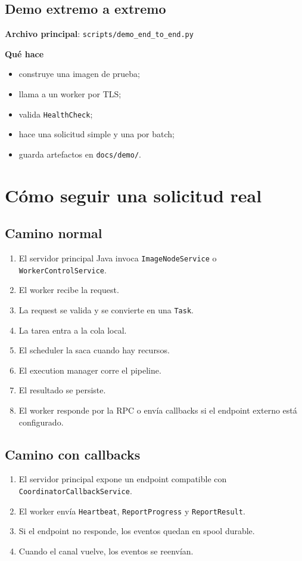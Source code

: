 \documentclass[11pt]{article}
\begin{document}
\subsection{Demo extremo a extremo}
\textbf{Archivo principal}: \texttt{scripts/demo\_end\_to\_end.py}

\textbf{Qué hace}
\begin{itemize}
\item construye una imagen de prueba;
\item llama a un worker por TLS;
\item valida \texttt{HealthCheck};
\item hace una solicitud simple y una por batch;
\item guarda artefactos en \texttt{docs/demo/}.
\end{itemize}

\section{Cómo seguir una solicitud real}

\subsection{Camino normal}
\begin{enumerate}
\item El servidor principal Java invoca \texttt{ImageNodeService} o \texttt{WorkerControlService}.
\item El worker recibe la request.
\item La request se valida y se convierte en una \texttt{Task}.
\item La tarea entra a la cola local.
\item El scheduler la saca cuando hay recursos.
\item El execution manager corre el pipeline.
\item El resultado se persiste.
\item El worker responde por la RPC o envía callbacks si el endpoint externo está configurado.
\end{enumerate}

\subsection{Camino con callbacks}
\begin{enumerate}
\item El servidor principal expone un endpoint compatible con \texttt{CoordinatorCallbackService}.
\item El worker envía \texttt{Heartbeat}, \texttt{ReportProgress} y \texttt{ReportResult}.
\item Si el endpoint no responde, los eventos quedan en spool durable.
\item Cuando el canal vuelve, los eventos se reenvían.
\end{enumerate}
\end{document}
